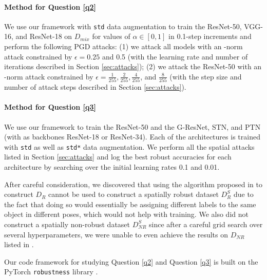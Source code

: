 \paragraph{Method for Question \ref{q2}} We use our framework with \texttt{std} data augmentation to train the ResNet-50, VGG-16, and ResNet-18 on $D_{mix}$ for values of $\alpha \in [0, 1]$ in 0.1-step increments and perform the following PGD attacks: (1) we attack all models with an \ltwo-norm attack constrained by $\epsilon = 0.25$ and 0.5 (with the learning rate and number of iterations described in Section \ref{sec:attacks}); (2) we attack the ResNet-50 with an \linf-norm attack constrained by $\epsilon = \frac{1}{255}, \frac{2}{255}, \frac{4}{255}$, and $\frac{8}{255}$ (with the step size and number of attack steps described in Section \ref{sec:attacks}).

\paragraph{Method for Question \ref{q3}} We use our framework to train the ResNet-50 and the G-ResNet, STN, and PTN (with as backbones ResNet-18 or ResNet-34). Each of the architectures is trained with \texttt{std} as well as \texttt{std*} data augmentation. We perform all the spatial attacks listed in Section \ref{sec:attacks} and log the best robust accuracies for each architecture by searching over the initial learning rates 0.1 and 0.01.

After careful consideration, we discovered that using the algorithm proposed in \cite{Ilyas2019} to construct $D_R$ cannot be used to construct a spatially robust dataset $D_R^S$ due to the fact that doing so would essentially be assigning different labels to the same object in different poses, which would not help with training. We also did not construct a spatially non-robust dataset $D_{NR}^S$ since after a careful grid search over several hyperparameters, we were unable to even achieve the results on $D_{NR}$ listed in \cite{Ilyas2019}.


Our code framework for studying Question \ref{q2} and Question \ref{q3} is built on the PyTorch \cite{Paszke19} \texttt{robustness} library \cite{robustness}.


